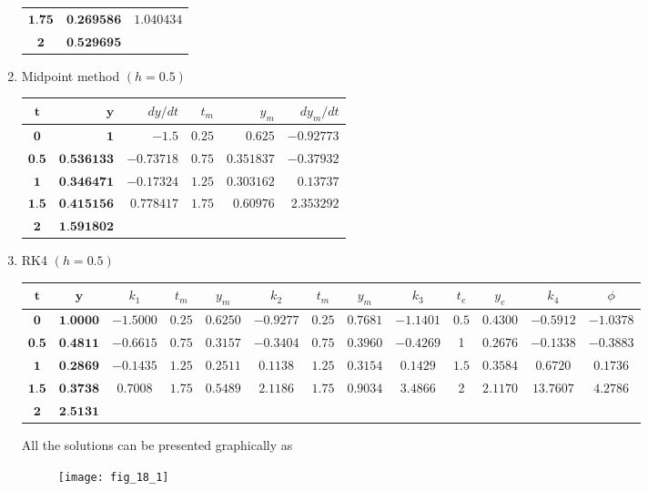 \documentclass[../main.tex]{subfiles}
\begin{document}
\begin{enumerate}[label=\bfseries(\alph*)]
\begin{tabular}{crr}
$\mathbf{1 . 7 5}$ & $\mathbf{0 . 2 6 9 5 8 6}$ & $1.040434$ \\
$\mathbf{2}$ & $\mathbf{0 . 5 2 9 6 9 5}$ &  \\
\hline
\end{tabular}
	\bigbreak
\item Midpoint method $(h=0.5)$
	\bigbreak
\begin{tabular}{crrrrr}
\hline
$\boldsymbol{t}$ & $\boldsymbol{y}$ & $d y / d t$ & $t_{m}$ & $y_{m}$ & $d y_{m} / d t$ \\
\hline
$\mathbf{0}$ & $\mathbf{1}$ & $-1.5$ & $0.25$ & $0.625$ & $-0.92773$ \\
$\mathbf{0 . 5}$ & $\mathbf{0 . 5 3 6 1 3 3}$ & $-0.73718$ & $0.75$ & $0.351837$ & $-0.37932$ \\
$\mathbf{1}$ & $\mathbf{0 . 3 4 6 4 7 1}$ & $-0.17324$ & $1.25$ & $0.303162$ & $0.13737$ \\
$\mathbf{1 . 5}$ & $\mathbf{0 . 4 1 5 1 5 6}$ & $0.778417$ & $1.75$ & $0.60976$ & $2.353292$ \\
$\mathbf{2}$ & $\mathbf{1 . 5 9 1 8 0 2}$ &  &  &  &  \\
\hline
\end{tabular}
	\bigbreak
\item RK4 $(h=0.5)$
	\bigbreak
\begin{tabular}{ccccccccccccc}
\hline
$\boldsymbol{t}$ & $\boldsymbol{y}$ & $k_{1}$ & $t_{m}$ & $y_{m}$ & $k_{2}$ & $t_{m}$ & $y_{m}$ & $k_{3}$ & $t_{e}$ & $y_{e}$ & $k_{4}$ & $\phi$\\
\hline
$\mathbf{0}$ & $\mathbf{1 . 0 0 0 0}$ & $-1.5000$ & $0.25$ & $0.6250$ & $-0.9277$ & $0.25$ & $0.7681$ & $-1.1401$ & $0.5$ & $0.4300$ & $-0.5912$ & $-1.0378$\\
$\mathbf{0 . 5}$ & $\mathbf{0 . 4 8 1 1}$ & $-0.6615$ & $0.75$ & $0.3157$ & $-0.3404$ & $0.75$ & $0.3960$ & $-0.4269$ & 1 & $0.2676$ & $-0.1338$ & $-0.3883$\\
$\mathbf{1}$ & $\mathbf{0 . 2 8 6 9}$ & $-0.1435$ & $1.25$ & $0.2511$ & $0.1138$ & $1.25$ & $0.3154$ & $0.1429$ & $1.5$ & $0.3584$ & $0.6720$ & $0.1736$\\
$\mathbf{1 . 5}$ & $\mathbf{0 . 3 7 3 8}$ & $0.7008$ & $1.75$ & $0.5489$ & $2.1186$ & $1.75$ & $0.9034$ & $3.4866$ & 2 & $2.1170$ & $13.7607$ & $4.2786$\\
$\mathbf{2}$ & $\mathbf{2 . 5 1 3 1}$ &  &  &  &  &  &  &  &  &  &  & \\
\hline
\end{tabular}
	\bigbreak
All the solutions can be presented graphically as
	\bigbreak
	\begin{figure}[H]
		\texttt{[image: fig\_18\_1]}
		\label{fig:fig_18_1}
	\end{figure}
\end{enumerate}
	\bigbreak
\end{document}
